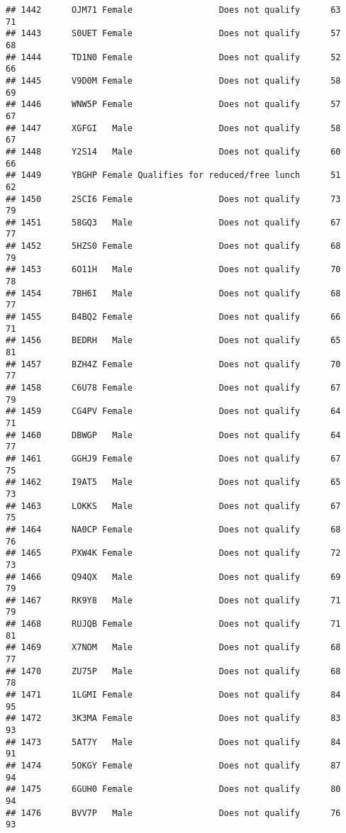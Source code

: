 \documentclass[
]{article}
\begin{document}
\begin{verbatim}
## 1442      OJM71 Female                 Does not qualify      63       71
## 1443      S0UET Female                 Does not qualify      57       68
## 1444      TD1N0 Female                 Does not qualify      52       66
## 1445      V9D0M Female                 Does not qualify      58       69
## 1446      WNW5P Female                 Does not qualify      57       67
## 1447      XGFGI   Male                 Does not qualify      58       67
## 1448      Y2S14   Male                 Does not qualify      60       66
## 1449      YBGHP Female Qualifies for reduced/free lunch      51       62
## 1450      2SCI6 Female                 Does not qualify      73       79
## 1451      58GQ3   Male                 Does not qualify      67       77
## 1452      5HZS0 Female                 Does not qualify      68       79
## 1453      6O11H   Male                 Does not qualify      70       78
## 1454      7BH6I   Male                 Does not qualify      68       77
## 1455      B4BQ2 Female                 Does not qualify      66       71
## 1456      BEDRH   Male                 Does not qualify      65       81
## 1457      BZH4Z Female                 Does not qualify      70       77
## 1458      C6U78 Female                 Does not qualify      67       79
## 1459      CG4PV Female                 Does not qualify      64       71
## 1460      DBWGP   Male                 Does not qualify      64       77
## 1461      GGHJ9 Female                 Does not qualify      67       75
## 1462      I9AT5   Male                 Does not qualify      65       73
## 1463      LOKKS   Male                 Does not qualify      67       75
## 1464      NA0CP Female                 Does not qualify      68       76
## 1465      PXW4K Female                 Does not qualify      72       73
## 1466      Q94QX   Male                 Does not qualify      69       79
## 1467      RK9Y8   Male                 Does not qualify      71       79
## 1468      RUJQB Female                 Does not qualify      71       81
## 1469      X7NOM   Male                 Does not qualify      68       77
## 1470      ZU75P   Male                 Does not qualify      68       78
## 1471      1LGMI Female                 Does not qualify      84       95
## 1472      3K3MA Female                 Does not qualify      83       93
## 1473      5AT7Y   Male                 Does not qualify      84       91
## 1474      5OKGY Female                 Does not qualify      87       94
## 1475      6GUH0 Female                 Does not qualify      80       94
## 1476      BVV7P   Male                 Does not qualify      76       93

\end{verbatim}
\end{document}
